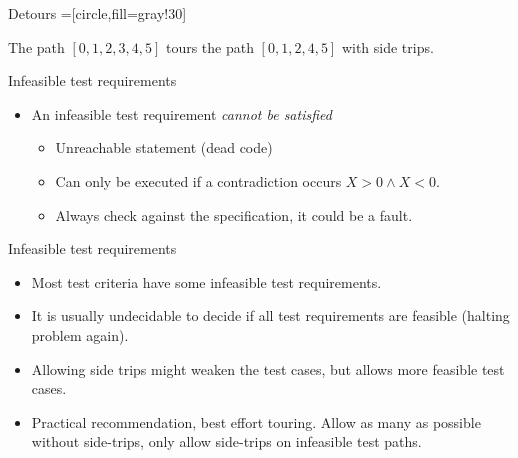 \documentclass[handout]{beamer}
\begin{document}
\begin{frame}{Detours}
 =[circle,fill=gray!30]
  
The path $[0,1,2,3,4,5]$ tours the path $[0,1,2,4,5]$ with side trips.
\end{frame}
\begin{frame}{Infeasible  test requirements}
  \begin{itemize}
  \item An infeasible test requirement {\em cannot be satisfied}
    \begin{itemize}
    \item Unreachable statement (dead code)
    \item Can only be executed if a contradiction occurs $X>0 \land
      X<0$.
    \item Always check against the specification, it could be a fault. 
    \end{itemize}
  \end{itemize}
  
\end{frame}
\begin{frame}{Infeasible  test requirements}
  \begin{itemize}
  \item   Most test criteria have some infeasible test requirements. 
  \item It is usually undecidable to decide if all test requirements
    are feasible (halting problem again).
  \item Allowing side trips might weaken the test cases, but allows
    more feasible test cases.
  \item Practical recommendation, best effort touring. Allow as many
    as possible without side-trips, only allow side-trips on
    infeasible test paths.
  \end{itemize}

  
\end{frame}
\end{document}
